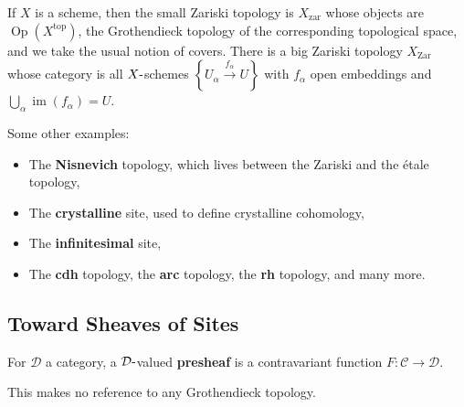 \begin{example}[?]

If \(X\) is a scheme, then the small Zariski topology is
\(X_{\mathrm{zar}}\) whose objects are
\({\operatorname{Op}}(X^{\mathrm{top}})\), the Grothendieck topology of
the corresponding topological space, and we take the usual notion of
covers. There is a big Zariski topology \(X_{\mathrm{Zar}}\) whose
category is all \(X{\hbox{-}}\)schemes
\(\left\{{U_\alpha\xrightarrow{f_\alpha} U}\right\}\) with \(f_\alpha\)
open embeddings and \(\bigcup_\alpha \operatorname{im}(f_\alpha) = U\).

\end{example}

\begin{example}[?]

Some other examples:

\begin{itemize}
\item
  The \textbf{Nisnevich} topology, which lives between the Zariski and
  the étale topology,
\item
  The \textbf{crystalline} site, used to define crystalline cohomology,
\item
  The \textbf{infinitesimal} site,
\item
  The \textbf{cdh} topology, the \textbf{arc} topology, the \textbf{rh}
  topology, and many more.
\end{itemize}

\end{example}

\hypertarget{toward-sheaves-of-sites}{%
\subsection{Toward Sheaves of Sites}\label{toward-sheaves-of-sites}}

\begin{definition}[Presheaf]

For \(\mathcal{D}\) a category, a \(\mathcal{D}{\hbox{-}}\)valued
\textbf{presheaf} is a contravariant function
\(F:\mathcal{C}\to \mathcal{D}\).

\end{definition}

\begin{remark}

This makes no reference to any Grothendieck topology.

\end{remark}

